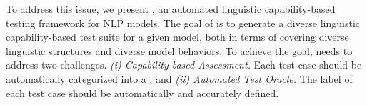 




To address this issue, we present \tool,
an automated linguistic capability-based testing framework for NLP models.  
The goal of \tool is to generate a diverse linguistic capability-based test suite for a given model, both in terms of covering diverse linguistic structures and diverse model behaviors.
To achieve the goal, \tool needs to address two challenges.
\textit{(i) Capability-based Assessment.} Each test case should be automatically categorized into a \lc;
and \textit{(ii) Automated Test Oracle.} The label of each test case should be automatically
  and accurately defined.


